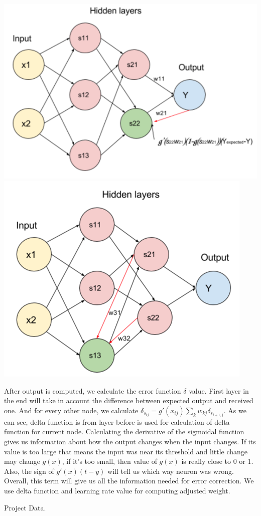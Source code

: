 \documentclass[12pt, letterpaper]{article}
\begin{document}
\begin{enumerate}[label=\Roman*.]
	{\center \includegraphics[scale=1]{3.png} \\}
	{\center \includegraphics[scale=1]{4.png} \\}
	
	After output is computed, we calculate the error function \(\delta\) value. First layer in the end will take in account the difference between expected output and received one. And for every other node, we calculate \( \delta_{s_{ij}} = g'(x_{ij})\sum_kw_{kj}\delta_{s_{i+1,j}} \). As we can see, delta function is from layer before is used for calculation of delta function for current node. Calculating the derivative of the sigmoidal function gives us information about how the output changes when the input changes. If its value is too large that means the input was near its threshold and little change may change  \(g(x)\), if it's too small, then value of \(g(x)\) is really close to 0 or 1. Also, the sign of \(g'(x)(t-y)\) will tell us which way neuron was wrong. Overall, this term will give us all the information needed for error correction. We use delta function and learning rate value for computing adjusted weight.
	{\bf \item Project Data.} \\
	

\end{enumerate}
\end{document}
